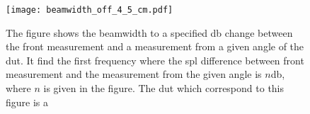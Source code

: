 \begin{figure}[htbp]
	\centering
	\texttt{[image: beamwidth\_off\_4\_5\_cm.pdf]}
	\caption{The figure shows the beamwidth to a specified \si{\decibel} change between the front measurement and a measurement from a given angle of the \gls{dut}. It find the first frequency where the \gls{spl} difference between front measurement and the measurement from the given angle is $n$\si{\decibel}, where $n$ is given in the figure. The \gls{dut} which correspond to this figure is a \citep{seas33}}
		\label{fig:beamwidth_offset_4.5_cm}
\end{figure}